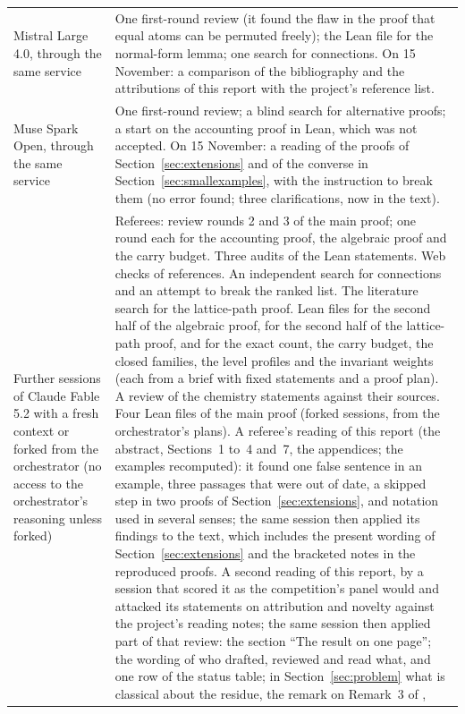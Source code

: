 \documentclass[11pt]{article}
\theoremstyle{definition}
\theoremstyle{remark}
\numberwithin{equation}{section}
\numberwithin{figure}{section}
\begin{document}
{\begin{longtable}{@{}>{\raggedright\arraybackslash}p{}>{\raggedright\arraybackslash}p{}@{}}
Mistral Large 4.0, through the same service & One first-round review (it found the flaw in the proof that
 equal atoms can be permuted freely); the Lean file for the normal-form lemma; one search for connections.
 On 15 November: a comparison of the bibliography and the attributions of this report with the project's
 reference list.\\\addlinespace[3pt]
Muse Spark Open, through the same service & One first-round review; a blind search for alternative proofs;
 a start on the accounting proof in Lean, which was not accepted. On 15 November: a reading of the proofs
 of Section~\ref{sec:extensions} and of the converse in Section~\ref{sec:smallexamples}, with the instruction
 to break them (no error found; three clarifications, now in the text).\\\addlinespace[3pt]
Further sessions of Claude Fable 5.2 with a fresh context or forked from the orchestrator (no access to the
 orchestrator's reasoning unless forked) & Referees: review rounds 2 and 3 of the main proof; one round each
 for the accounting proof, the algebraic proof and the carry budget. Three audits of the Lean statements. Web
 checks of references. An independent search for connections and an attempt to break the ranked list. The
 literature search for the lattice-path proof. Lean files for the second half of the algebraic proof, for
 the second half of the lattice-path proof, and for the exact count, the carry budget, the closed families,
 the level profiles and the invariant weights (each from a brief with fixed statements and a proof plan). A
 review of the chemistry statements against their sources. Four Lean files of the main proof (forked
 sessions, from the orchestrator's plans). A referee's reading of this report (the abstract, Sections~1 to~4
 and~7, the appendices; the examples recomputed): it found one false sentence in an example, three passages
 that were out of date, a skipped step in two proofs of Section~\ref{sec:extensions}, and notation used in
 several senses; the same session then applied its findings to the text, which includes the present wording
 of Section~\ref{sec:extensions} and the bracketed notes in the reproduced proofs. A second reading of this
 report, by a session that scored it as the competition's panel would and attacked its statements on
 attribution and novelty against the project's reading notes; the same session then applied part of that
 review: the section ``The result on one page''; the wording of who drafted, reviewed and read what, and one
 row of the status table; in
 Section~\ref{sec:problem} what is classical about the residue, the remark on Remark~3 of \cite{Konvalinka},

\end{longtable}}
\end{document}
